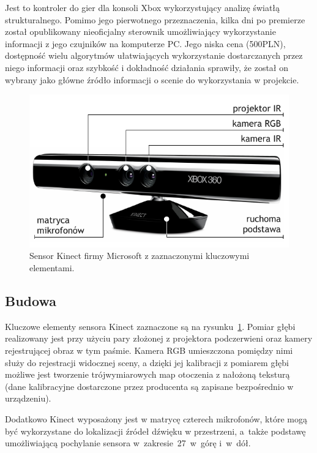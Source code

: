 Jest to kontroler do gier dla konsoli Xbox wykorzystujący analizę światłą strukturalnego.
Pomimo jego pierwotnego przeznaczenia, kilka dni po premierze został opublikowany
nieoficjalny sterownik umożliwiający wykorzystanie informacji z jego czujników na
komputerze PC. Jego niska cena (500PLN), dostępność wielu algorytmów ułatwiających
wykorzystanie dostarczanych przez niego informacji oraz szybkość i dokładność
działania sprawiły, że został on wybrany jako główne źródło informacji o scenie
do wykorzystania w projekcie.

\begin{figure}[h!]
\centering
\includegraphics[width=\columnwidth]{../img/kinect_hardware}
\caption[Sensor Kinect firmy Microsoft]{Sensor Kinect firmy Microsoft z zaznaczonymi
kluczowymi elementami.}
\label{fig:kinect_hardware}
\end{figure}

\subsection{Budowa}

Kluczowe elementy sensora Kinect zaznaczone są na rysunku~\ref{fig:kinect_hardware}.
Pomiar głębi realizowany jest przy użyciu pary złożonej z projektora podczerwieni
oraz kamery rejestrującej obraz w tym paśmie. Kamera RGB umieszczona pomiędzy nimi
służy do rejestracji widocznej sceny, a dzięki jej kalibracji z pomiarem głębi
możliwe jest tworzenie trójwymiarowych map otoczenia z nałożoną teksturą (dane
kalibracyjne dostarczone przez producenta są zapisane bezpośrednio w urządzeniu).

Dodatkowo Kinect wyposażony jest w matrycę czterech mikrofonów, które mogą być
wykorzystane do lokalizacji źródeł dźwięku w przestrzeni, a~także podstawę umożliwiającą
pochylanie sensora w~zakresie~27\textdegree~w~górę i~w~dół.

